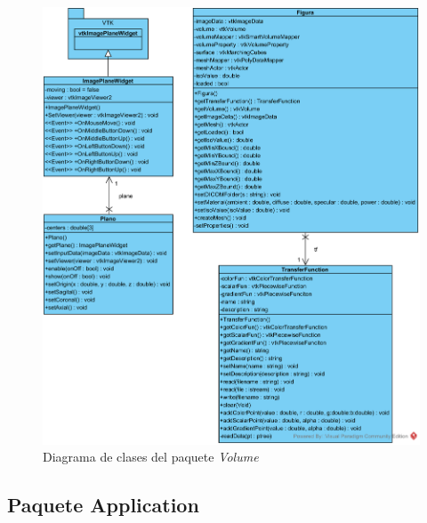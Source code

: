 \begin{figure}[H]
	\centering
	\includegraphics[width=12.5cm]{imagenes/diagramas/volume}
	\caption{Diagrama de clases del paquete \textit{Volume}}
	\label{fig:diagrama_clases_volume}
\end{figure}

\subsection{Paquete Application}

